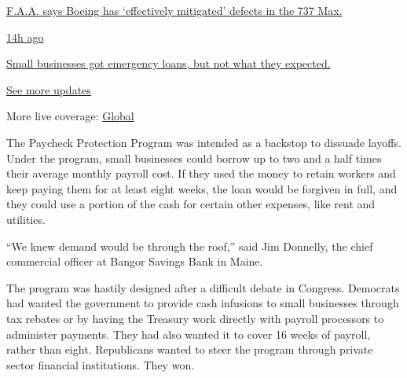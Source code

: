 \href{https://www.nytimes3xbfgragh.onion/live/2020/08/03/business/stock-market-today-coronavirus?action=click\&pgtype=Article\&state=default\&region=MAIN_CONTENT_1\&context=storylines_live_updates\#faa-says-boeing-has-effectively-mitigated-defects-in-the-737-max}{F.A.A.
says Boeing has `effectively mitigated' defects in the 737 Max.}

\href{https://www.nytimes3xbfgragh.onion/live/2020/08/03/business/stock-market-today-coronavirus?action=click\&pgtype=Article\&state=default\&region=MAIN_CONTENT_1\&context=storylines_live_updates\#small-businesses-got-emergency-loans-but-not-what-they-expected}{14h
ago}

\href{https://www.nytimes3xbfgragh.onion/live/2020/08/03/business/stock-market-today-coronavirus?action=click\&pgtype=Article\&state=default\&region=MAIN_CONTENT_1\&context=storylines_live_updates\#small-businesses-got-emergency-loans-but-not-what-they-expected}{Small
businesses got emergency loans, but not what they expected.}

\href{https://www.nytimes3xbfgragh.onion/live/2020/08/03/business/stock-market-today-coronavirus?action=click\&pgtype=Article\&state=default\&region=MAIN_CONTENT_1\&context=storylines_live_updates}{See
more updates}

More live coverage:
\href{https://www.nytimes3xbfgragh.onion/2020/08/03/world/coronavirus-covid-19.html?action=click\&pgtype=Article\&state=default\&region=MAIN_CONTENT_1\&context=storylines_live_updates}{Global}

The Paycheck Protection Program was intended as a backstop to dissuade
layoffs. Under the program, small businesses could borrow up to two and
a half times their average monthly payroll cost. If they used the money
to retain workers and keep paying them for at least eight weeks, the
loan would be forgiven in full, and they could use a portion of the cash
for certain other expenses, like rent and utilities.

``We knew demand would be through the roof,'' said Jim Donnelly, the
chief commercial officer at Bangor Savings Bank in Maine.

The program was hastily designed after a difficult debate in Congress.
Democrats had wanted the government to provide cash infusions to small
businesses through tax rebates or by having the Treasury work directly
with payroll processors to administer payments. They had also wanted it
to cover 16 weeks of payroll, rather than eight. Republicans wanted to
steer the program through private sector financial institutions. They
won.


